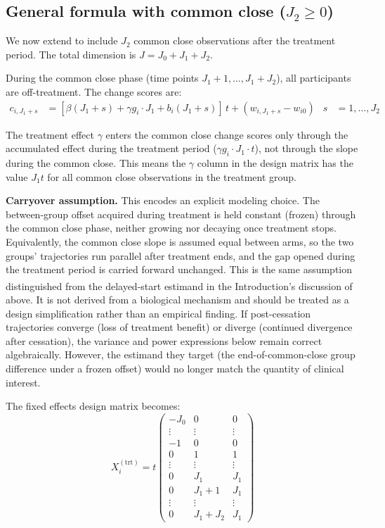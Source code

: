 \documentclass[
  11pt,
]{article}
\begin{document}
\subsection{\texorpdfstring{General formula with common close (\(J_2 \ge 0\))}{General formula with common close (J\_2 \textbackslash ge 0)}}\label{general-formula-with-common-close-j_2-ge-0}

We now extend to include \(J_2\) common close observations after
the treatment period. The total dimension is \(J = J_0 + J_1 + J_2\).

During the common close phase (time points \(J_1+1, \ldots,
J_1+J_2\)), all participants are off-treatment. The change scores
are:
\begin{align}
  c_{i,J_1+s} &= [\beta(J_1+s) + \gamma g_i \cdot J_1 + b_i(J_1+s)]
    \,t + (w_{i,J_1+s} - w_{i0})
    & s &= 1,\ldots,J_2
\end{align}

The treatment effect \(\gamma\) enters the common close change
scores only through the accumulated effect during the
treatment period (\(\gamma g_i \cdot J_1 \cdot t\)), not through
the slope during the common close. This means the \(\gamma\)
column in the design matrix has the value \(J_1 t\) for all common
close observations in the treatment group.

\textbf{Carryover assumption.} This encodes an explicit modeling
choice. The between-group offset acquired during treatment is
held constant (frozen) through the common close phase, neither
growing nor decaying once treatment stops. Equivalently, the
common close slope is assumed equal between arms, so the two
groups' trajectories run parallel after treatment ends, and the
gap opened during the treatment period is carried forward
unchanged. This is the same assumption distinguished from the
delayed-start estimand in the Introduction's discussion of\textsuperscript{} above. It is not derived from a biological
mechanism and should be treated as a design simplification
rather than an empirical finding. If post-cessation trajectories
converge (loss of treatment benefit) or diverge (continued
divergence after cessation), the variance and power expressions
below remain correct algebraically. However, the estimand they
target (the end-of-common-close group difference under a frozen
offset) would no longer match the quantity of clinical
interest.

The fixed effects design matrix becomes:
\[
  X_i^{(\text{trt})} = t\begin{pmatrix}
    -J_0   & 0 & 0 \\
    \vdots & \vdots & \vdots \\
    -1   & 0 & 0 \\
    0    & 1 & 1 \\
    \vdots & \vdots & \vdots \\
    0    & J_1 & J_1 \\
    0    & J_1+1 & J_1 \\
    \vdots & \vdots & \vdots \\
    0    & J_1+J_2 & J_1
  \end{pmatrix}
\]
\end{document}
